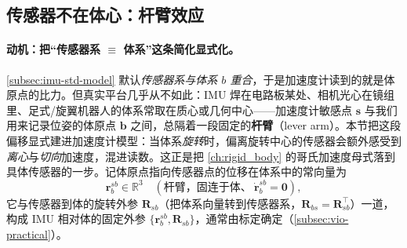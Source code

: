 \subsection{传感器不在体心：杆臂效应}
\label{subsec:imu-leverarm}

\paragraph{动机：把“传感器系 $\equiv$ 体系”这条简化显式化。}
\cref{subsec:imu-std-model} 默认\emph{传感器系与体系 $b$ 重合}，于是加速度计读到的就是体原点的比力。但真实平台几乎从不如此：IMU 焊在电路板某处、相机光心在镜组里、足式/旋翼机器人的体系常取在质心或几何中心——加速度计敏感点 $\mathbf s$ 与我们用来记录位姿的体原点 $\mathbf b$ 之间，总隔着一段固定的\textbf{杆臂}（lever arm）。本节把这段偏移显式建进加速度计模型：当体系\emph{旋转}时，偏离旋转中心的传感器会额外感受到\emph{离心}与\emph{切向}加速度，混进读数。这正是把 \cref{ch:rigid_body} 的哥氏加速度母式落到具体传感器的一步。记体原点指向传感器点的位移在体系中的常向量为
\begin{equation}
  \mathbf r_b^{sb}\in\mathbb R^3\quad(\text{杆臂，固连于体、}\ \dot{\mathbf r}_b^{sb}=\mathbf 0),
  \label{eq:imu-leverarm-def}
\end{equation}
它与传感器到体的旋转外参 $\mathbf R_{sb}$（把体系向量转到传感器系，$\mathbf R_{bs}=\mathbf R_{sb}^\top$）一道，构成 IMU 相对体的固定外参 $\{\mathbf r_b^{sb},\mathbf R_{sb}\}$，通常由标定确定（\cref{subsec:vio-practical}）。

